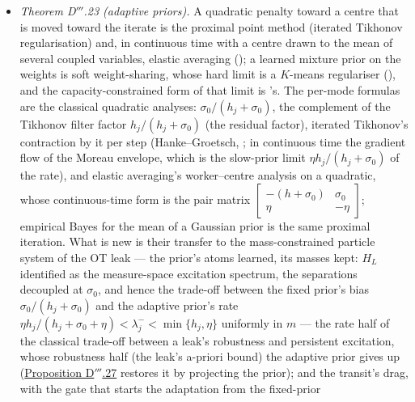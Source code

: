 \begin{itemize}
  \item \emph{Theorem D$'''$.23 (adaptive priors).} A quadratic penalty toward a centre that is moved toward the
    iterate is the proximal point method (iterated Tikhonov regularisation) and, in continuous time with a centre
    drawn to the mean of several coupled variables, elastic averaging (\cite{S49}); a learned mixture prior on the
    weights is soft weight-sharing, whose hard limit is a $K$-means regulariser (\cite{S49}), and the
    capacity-constrained form of that limit is \cite{S19}'s. The per-mode formulas are the classical quadratic
    analyses: $\sigma_0/(h_j + \sigma_0)$, the complement of the Tikhonov filter factor $h_j/(h_j + \sigma_0)$ (the
    residual factor), iterated Tikhonov's contraction by it per step (Hanke--Groetsch, \cite{S49}; in continuous time
    the gradient flow of the Moreau envelope, which is the slow-prior limit $\eta h_j/(h_j + \sigma_0)$ of the rate),
    and elastic averaging's worker--centre analysis on a quadratic, whose continuous-time form is the pair matrix
    $\left[\begin{smallmatrix}-(h + \sigma_0) & \sigma_0\\ \eta & -\eta\end{smallmatrix}\right]$; empirical Bayes for
    the mean of a Gaussian prior is the same proximal iteration. What is new is their transfer to the mass-constrained
    particle system of the OT leak --- the prior's atoms learned, its masses kept: $H_L$ identified as the
    measure-space excitation spectrum, the separations decoupled at $\sigma_0$, and hence the trade-off between the
    fixed prior's bias $\sigma_0/(h_j + \sigma_0)$ and the adaptive prior's rate
    $\eta h_j/(h_j + \sigma_0 + \eta) < \lambda_j^- < \min\{h_j,\eta\}$ uniformly in $m$ --- the rate half of the
    classical trade-off between a leak's robustness and persistent excitation, whose robustness half (the leak's
    a-priori bound) the adaptive prior gives up (\hyperref[res:thmDppp:27]{Proposition D$'''$.27} restores it by
    projecting the prior); and the transit's drag, with the gate that starts the adaptation from the fixed-prior

\end{itemize}
